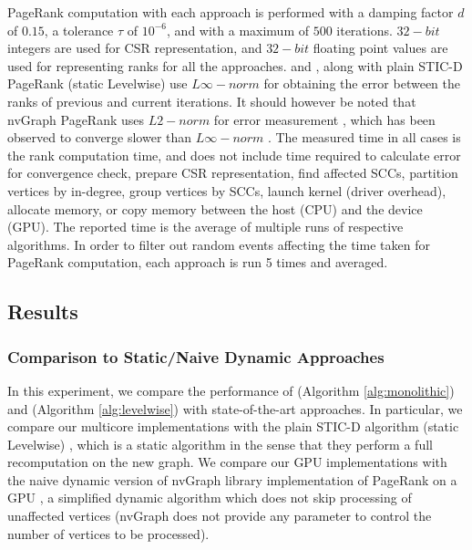 PageRank computation with each approach is performed with a damping factor $d$ of $0.15$, a tolerance $\tau$ of $10^{-6}$, and with a maximum of $500$ iterations. $32-bit$ integers are used for CSR representation, and $32-bit$ floating point values are used for representing ranks for all the approaches. \monolithicPR{} and \levelwisePR{}, along with plain STIC-D PageRank (static Levelwise) use $L\infty{}-norm$ for obtaining the error between the ranks of previous and current iterations. It should however be noted that nvGraph PageRank uses $L2{}-norm$ for error measurement \cite{pr-nvgraph}, which has been observed to converge slower than $L\infty{}-norm$ \cite{gh-levl21}. The measured time in all cases is the rank computation time, and does not include time required to calculate error for convergence check, prepare CSR representation, find affected SCCs, partition vertices by in-degree, group vertices by SCCs, launch kernel (driver overhead), allocate memory, or copy memory between the host (CPU) and the device (GPU). The reported time is the average of multiple runs of respective algorithms. In order to filter out random events affecting the time taken for PageRank computation, each approach is run 5 times and averaged.




\subsection{Results}

\subsubsection{\bf Comparison to Static/Naive Dynamic Approaches}

In this experiment, we compare the performance of \monolithicPR{} (Algorithm \ref{alg:monolithic}) and \levelwisePR{} (Algorithm \ref{alg:levelwise}) with state-of-the-art approaches. In particular, we compare our multicore implementations with the plain STIC-D algorithm (static Levelwise) \cite{pr-sticd16}, which is a static algorithm in the sense that they perform a full recomputation on the new graph. We compare our GPU implementations with the naive dynamic version of nvGraph library implementation of PageRank on a GPU \cite{pr-nvgraph}, a simplified dynamic algorithm which does not skip processing of unaffected vertices (nvGraph does not provide any parameter to control the number of vertices to be processed).

